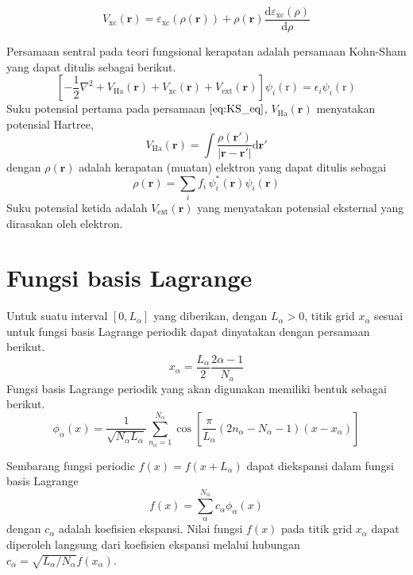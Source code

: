 \documentclass[%
reprint,
amsmath,
amssymb,
aps,
]{revtex4-1}
\begin{document}
\begin{equation}
V_{\mathrm{xc}}(\mathbf{r}) = \varepsilon_{\mathrm{xc}}(\rho(\mathbf{r}))
+ \rho(\mathbf{r})\frac{\mathrm{d}\varepsilon_{\mathrm{xc}}(\rho)}{\mathrm{d}\rho}
\end{equation}

Persamaan sentral pada teori fungsional kerapatan adalah persamaan
Kohn-Sham yang dapat ditulis sebagai berikut.
\begin{equation}
\left[
-\frac{1}{2}\nabla^2
+ V_{\mathrm{Ha}}(\mathbf{r})
+ V_{\mathrm{xc}}(\mathbf{r})
+ V_{\mathrm{ext}}(\mathbf{r})
\right]\psi_{i}(\mathrm{r}) =
\epsilon_{i} \psi_{i}(\mathrm{r})
\label{eq:KS_eq}
\end{equation}
Suku potensial pertama pada persamaan $\eqref{eq:KS_eq}$,
$V_{\mathrm{Ha}}(\mathbf{r})$ menyatakan potensial Hartree,
\begin{equation}
V_{\mathrm{Ha}}(\mathbf{r}) =
\int
\frac{\rho(\mathbf{r}')}{\left|\mathbf{r} - \mathbf{r}'\right|}
\mathrm{d}\mathbf{r}'
\end{equation}
dengan $\rho(\mathbf{r})$ adalah kerapatan (muatan) elektron
yang dapat ditulis sebagai
\begin{equation}
\rho(\mathbf{r}) = \sum_{i} f_{i}\, \psi^{*}_{i}(\mathbf{r}) \psi_{i}(\mathbf{r})
\end{equation}
Suku potensial ketida adalah $V_{\mathrm{ext}}(\mathbf{r})$
yang menyatakan potensial eksternal yang dirasakan oleh elektron.


\section{Fungsi basis Lagrange}

Untuk suatu interval $[0,L_{\alpha}]$ yang diberikan, dengan $L_{\alpha} > 0$, titik grid
$x_{\alpha}$ sesuai untuk fungsi basis
Lagrange periodik dapat dinyatakan dengan persamaan berikut.
\begin{equation}
x_{\alpha} = \frac{L_{\alpha}}{2}\frac{2\alpha-1}{N_{a}}
\end{equation}
Fungsi basis Lagrange periodik yang akan digunakan
memiliki bentuk sebagai berikut.
\begin{equation}
\phi_{\alpha}(x) = \frac{1}{\sqrt{N_{\alpha}L_{\alpha}}}
\sum_{n_{\alpha}=1}^{N_{\alpha}} \cos\left[
\frac{\pi}{L_{\alpha}}(2n_{\alpha} - N_{\alpha} - 1)(x-x_{\alpha})
\right]
\end{equation}

Sembarang fungsi periodic $f(x) = f(x+L_{\alpha})$ dapat diekspansi dalam fungsi basis
Lagrange
\begin{equation}
f(x) = \sum_{\alpha}^{N_{\alpha}} c_{\alpha} \phi_{\alpha}(x)
\end{equation}
dengan $c_{\alpha}$ adalah koefisien ekspansi.
Nilai fungsi $f(x)$ pada titik grid $x_{\alpha}$ dapat diperoleh langsung
dari koefisien ekspansi melalui hubungan
$c_{\alpha} = \sqrt{L_{\alpha}/N_{\alpha}}f(x_{\alpha})$.
\end{document}

